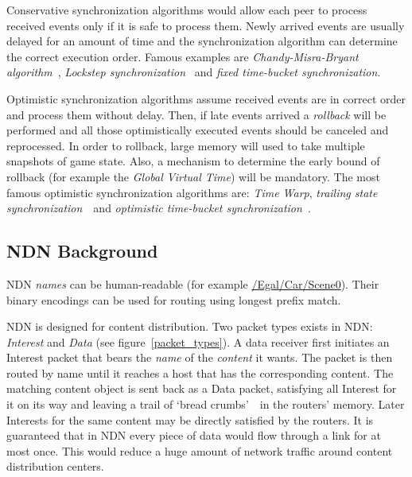 \documentclass{sigchi}
\begin{document}
Conservative synchronization algorithms would allow each peer to process received events only if it is safe to process them. Newly arrived events are usually delayed for an amount of time and the synchronization algorithm can determine the correct execution order. Famous examples are \emph{Chandy-Misra-Bryant algorithm}~\cite{Chandy, Bryant}, \emph{Lockstep synchronization}~\cite{Flockstep} and \emph{fixed time-bucket synchronization}. %

Optimistic synchronization algorithms assume received events are in correct order and process them without delay. Then, if late events arrived a \emph{rollback} will be performed and all those optimistically executed events should be canceled and reprocessed. In order to rollback, large memory will used to take multiple snapshots of game state. Also, a mechanism to determine the early bound of rollback (for example the \emph{Global Virtual Time}) will be mandatory. The most famous optimistic synchronization algorithms are: \emph{Time Warp}, \emph{trailing state synchronization}~\cite{Csync}~and \emph{optimistic time-bucket synchronization}~\cite{Doptbkt}.

\subsection{NDN Background}
\label{ndnbg}

NDN \emph{names} can be human-readable (for example \url{/Egal/Car/Scene0}). Their binary encodings can be used for routing using longest prefix match.

NDN is designed for content distribution. Two packet types exists in NDN: \emph{Interest} and \emph{Data} (see figure~\ref{packet_types}). A data receiver first initiates an Interest packet that bears the \emph{name} of the \emph{content} it wants. The packet is then routed by name until it reaches a host that has the corresponding content. The matching content object is sent back as a Data packet, satisfying all Interest for it on its way and leaving a trail of `bread crumbs'~\cite{Jndn}~in the routers' memory. Later Interests for the same content may be directly satisfied by the routers. It is guaranteed that in NDN every piece of data would flow through a link for at most once. This would reduce a huge amount of network traffic around content distribution centers.
\end{document}
